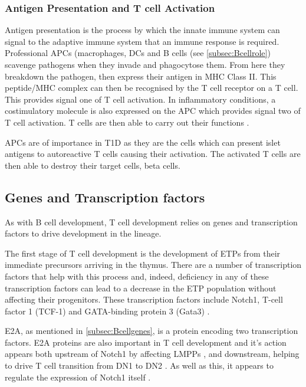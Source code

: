 \subsubsection{Antigen Presentation and T cell Activation}

Antigen presentation is the process by which the innate immune system can signal to the adaptive immune system that an immune response is required.
Professional APCs (macrophages, DCs and B cells (see \cref{subsec:Bcellrole}) scavenge pathogens when they invade and phagocytose them.
From here they breakdown the pathogen, then express their antigen in MHC Class II.
This peptide/MHC complex can then be recognised by the T cell receptor on a T cell.
This provides signal one of T cell activation.
In inflammatory conditions, a costimulatory molecule is also expressed on the APC which provides signal two of T cell activation.
T cells are then able to carry out their functions .

APCs are of importance in T1D as they are the cells which can present islet antigens to autoreactive T cells causing their activation.
The activated T cells are then able to destroy their target cells, beta cells.

\subsection{Genes and Transcription factors}
\label{subsec:Tcellgenes}

As with B cell development, T cell development relies on genes and transcription factors to drive development in the lineage.

The first stage of T cell development is the development of ETPs from their immediate precursors arriving in the thymus.
There are a number of transcription factors that help with this process and, indeed, deficiency in any of these transcription factors can lead to a decrease in the ETP population without affecting their progenitors.
These transcription factors include Notch1, T-cell factor 1 (TCF-1) and GATA-binding protein 3 (Gata3) \citep{Sambandam2005, Naito2011, Weber2011, Hosoya2009}.

E2A, as mentioned in \cref{subsec:Bcellgenes}, is a protein encoding two transcription factors.
E2A proteins are also important in T cell development and it's action appears both upstream of Notch1 by affecting LMPPs \citep{Dias2008}, and downstream, helping to drive T cell transition from DN1 to DN2 \citep{Naito2011}.
As well as this, it appears to regulate the expression of Notch1 itself \citep{Dias2008}.


